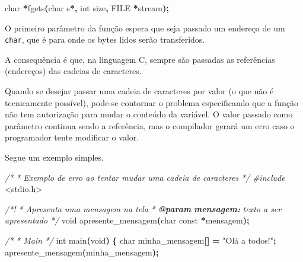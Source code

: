 \documentclass[
  11pt,
  a4paper,
]{scrbook}
\newenvironment{Shaded}{\begin{snugshade}}{\end{snugshade}}
\newcommand{\AnnotationTok}[1]{\textcolor[rgb]{0.56,0.35,0.01}{\textbf{\textit{#1}}}}
\newcommand{\CommentTok}[1]{\textcolor[rgb]{0.56,0.35,0.01}{\textit{#1}}}
\newcommand{\CommentVarTok}[1]{\textcolor[rgb]{0.56,0.35,0.01}{\textbf{\textit{#1}}}}
\newcommand{\DataTypeTok}[1]{\textcolor[rgb]{0.13,0.29,0.53}{#1}}
\newcommand{\ImportTok}[1]{#1}
\newcommand{\NormalTok}[1]{#1}
\newcommand{\OperatorTok}[1]{\textcolor[rgb]{0.81,0.36,0.00}{\textbf{#1}}}
\newcommand{\PreprocessorTok}[1]{\textcolor[rgb]{0.56,0.35,0.01}{\textit{#1}}}
\newcommand{\StringTok}[1]{\textcolor[rgb]{0.31,0.60,0.02}{#1}}
\begin{document}
\begin{Shaded}
\begin{Highlighting}[]
\DataTypeTok{char} \OperatorTok{*}\NormalTok{fgets}\OperatorTok{(}\DataTypeTok{char}\NormalTok{ s}\OperatorTok{*,} \DataTypeTok{int}\NormalTok{ size}\OperatorTok{,} \DataTypeTok{FILE} \OperatorTok{*}\NormalTok{stream}\OperatorTok{);}
\end{Highlighting}
\end{Shaded}

O primeiro parâmetro da função espera que seja passado um endereço de um
\texttt{char}, que é para onde os bytes lidos serão transferidos.

A consequência é que, na linguagem C, sempre são passadas as referências
(endereços) das cadeias de caracteres.

\begin{tcolorbox}[enhanced jigsaw, arc=.35mm, bottomtitle=1mm, colbacktitle=quarto-callout-tip-color!10!white, title=\textcolor{quarto-callout-tip-color}{\faLightbulb}\hspace{0.5em}{Dica}, toprule=.15mm, left=2mm, opacityback=0, colback=white, colframe=quarto-callout-tip-color-frame, opacitybacktitle=0.6, bottomrule=.15mm, leftrule=.75mm, toptitle=1mm, coltitle=black, titlerule=0mm, rightrule=.15mm, breakable]

Quando se desejar passar uma cadeia de caracteres por valor (o que não é
tecnicamente possível), pode-se contornar o problema especificando que a
função não tem autorização para mudar o conteúdo da variável. O valor
passado como parâmetro continua sendo a referência, mas o compilador
gerará um erro caso o programador tente modificar o valor.

Segue um exemplo simples.

\begin{Shaded}
\begin{Highlighting}[]
\CommentTok{/*}
\CommentTok{ * Exemplo de erro ao tentar mudar uma cadeia de caracteres}
\CommentTok{ */}
\PreprocessorTok{\#include }\ImportTok{\textless{}stdio.h\textgreater{}}

\CommentTok{/*!}
\CommentTok{ * Apresenta uma mensagem na tela}
\CommentTok{ * }\AnnotationTok{@param}\CommentTok{ }\CommentVarTok{mensagem:}\CommentTok{ texto a ser apresentado}
\CommentTok{ */}
\DataTypeTok{void}\NormalTok{ apresente\_mensagem}\OperatorTok{(}\DataTypeTok{char} \DataTypeTok{const} \OperatorTok{*}\NormalTok{mensagem}\OperatorTok{);}

\CommentTok{/*}
\CommentTok{ * Main}
\CommentTok{ */}
\DataTypeTok{int}\NormalTok{ main}\OperatorTok{(}\DataTypeTok{void}\OperatorTok{)} \OperatorTok{\{}
    \DataTypeTok{char}\NormalTok{ minha\_mensagem}\OperatorTok{[]} \OperatorTok{=} \StringTok{"Olá a todos!"}\OperatorTok{;}
\NormalTok{    apresente\_mensagem}\OperatorTok{(}\NormalTok{minha\_mensagem}\OperatorTok{);}


\end{Highlighting}
\end{Shaded}
\end{tcolorbox}
\end{document}
